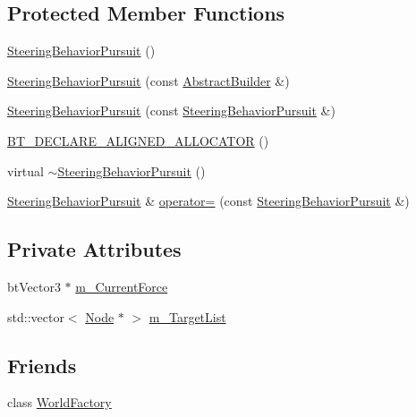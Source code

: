 \subsection*{Protected Member Functions}
\begin{DoxyCompactItemize}
\item 
\mbox{\hyperlink{classnjli_1_1_steering_behavior_pursuit_a35adf5e8a85c284ff1f3afb291b82666}{Steering\+Behavior\+Pursuit}} ()
\item 
\mbox{\hyperlink{classnjli_1_1_steering_behavior_pursuit_a15c95eec77532033d4570c06ee164125}{Steering\+Behavior\+Pursuit}} (const \mbox{\hyperlink{classnjli_1_1_abstract_builder}{Abstract\+Builder}} \&)
\item 
\mbox{\hyperlink{classnjli_1_1_steering_behavior_pursuit_a9a7c7c7fdb68f649b9cc906eb73eec7a}{Steering\+Behavior\+Pursuit}} (const \mbox{\hyperlink{classnjli_1_1_steering_behavior_pursuit}{Steering\+Behavior\+Pursuit}} \&)
\item 
\mbox{\hyperlink{classnjli_1_1_steering_behavior_pursuit_a140094403224ba19587b7b7467957f22}{B\+T\+\_\+\+D\+E\+C\+L\+A\+R\+E\+\_\+\+A\+L\+I\+G\+N\+E\+D\+\_\+\+A\+L\+L\+O\+C\+A\+T\+OR}} ()
\item 
virtual \mbox{\hyperlink{classnjli_1_1_steering_behavior_pursuit_af7de364c675ab4f8ba192366f29efd44}{$\sim$\+Steering\+Behavior\+Pursuit}} ()
\item 
\mbox{\hyperlink{classnjli_1_1_steering_behavior_pursuit}{Steering\+Behavior\+Pursuit}} \& \mbox{\hyperlink{classnjli_1_1_steering_behavior_pursuit_a6bc580bff0689c9ec9c1426483d7a07c}{operator=}} (const \mbox{\hyperlink{classnjli_1_1_steering_behavior_pursuit}{Steering\+Behavior\+Pursuit}} \&)
\end{DoxyCompactItemize}
\subsection*{Private Attributes}
\begin{DoxyCompactItemize}
\item 
bt\+Vector3 $\ast$ \mbox{\hyperlink{classnjli_1_1_steering_behavior_pursuit_a2a725fd2767f95c9dec91c145a3ff9f7}{m\+\_\+\+Current\+Force}}
\item 
std\+::vector$<$ \mbox{\hyperlink{classnjli_1_1_node}{Node}} $\ast$ $>$ \mbox{\hyperlink{classnjli_1_1_steering_behavior_pursuit_a283043aaa5ea2a7998baf38565fca847}{m\+\_\+\+Target\+List}}
\end{DoxyCompactItemize}
\subsection*{Friends}
\begin{DoxyCompactItemize}
\item 
class \mbox{\hyperlink{classnjli_1_1_steering_behavior_pursuit_acb96ebb09abe8f2a37a915a842babfac}{World\+Factory}}
\end{DoxyCompactItemize}
